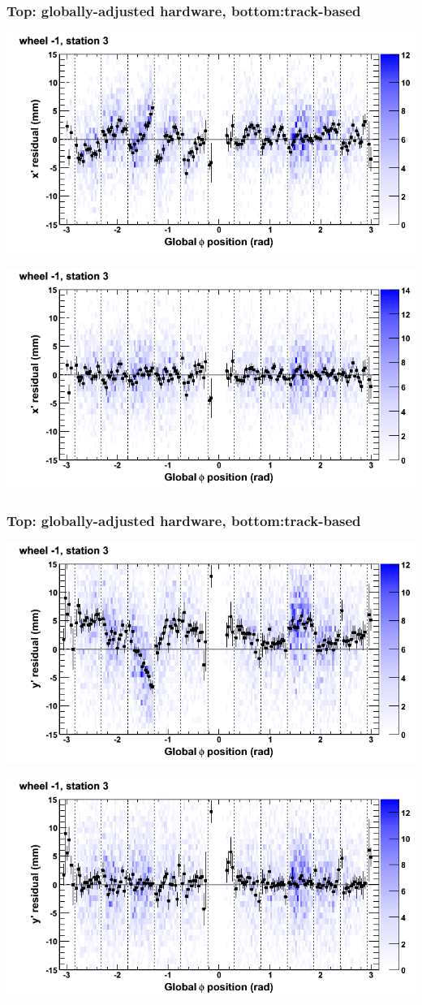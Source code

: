 \documentclass[compress]{beamer}
\begin{document}
\begin{frame}
\frametitle{Top: globally-adjusted hardware, bottom:track-based}
\includegraphics[width=0.7\linewidth]{NOV4_mapplots_HW/DTvsphi_st3whB_x.png}

\includegraphics[width=0.7\linewidth]{NOV4_mapplots/DTvsphi_st3whB_x.png}
\end{frame}

\begin{frame}
\frametitle{Top: globally-adjusted hardware, bottom:track-based}
\includegraphics[width=0.7\linewidth]{NOV4_mapplots_HW/DTvsphi_st3whB_y.png}

\includegraphics[width=0.7\linewidth]{NOV4_mapplots/DTvsphi_st3whB_y.png}
\end{frame}
\end{document}
